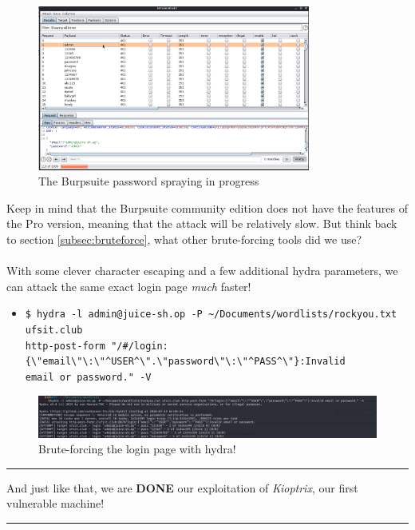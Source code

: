 \documentclass[a4paper,11pt]{article}
\renewcommand{\tt}[2][tt]{\textcolor{#1}{\ttfamily #2}}%
\begin{document}
\begin{figure}[ht]
    \centering
    \includegraphics[width=0.8\textwidth]{images/sample-burp-attack.png}
    \caption{The Burpsuite password spraying in progress}
    \label{fig:sample-burp-attack}
\end{figure}

Keep in mind that the Burpsuite community edition does not have the features of the Pro version, meaning that the attack will be relatively slow. But think back to section \ref{subsec:bruteforce}, what other brute-forcing tools did we use?
\\
\\
With some clever character escaping and a few additional \tt{hydra} parameters, we can attack the same exact login page \textit{much} faster!
\begin{itemize}
    \color{tt}
    \item 
\begin{verbatim}
$ hydra -l admin@juice-sh.op -P ~/Documents/wordlists/rockyou.txt ufsit.club
http-post-form "/#/login:{\"email\"\:\"^USER^\".\"password\"\:\"^PASS^\"}:Invalid
email or password." -V
\end{verbatim}
    \color{black}
\end{itemize}

\begin{figure}[h]
    \centering
    \includegraphics[width=1\textwidth]{images/hydrajuiceWORKED.png}
    \caption{Brute-forcing the login page with \tt{hydra}!}
    \label{fig:hydrajuiceWORKED}
\end{figure}


\par\noindent\rule{\textwidth}{0.4pt}
\begin{center}
And just like that, we are {\bfseries DONE} our exploitation of \textit{Kioptrix}, our first vulnerable machine!
\end{center}
\par\noindent\rule{\textwidth}{0.4pt}
\pagebreak
\end{document}
